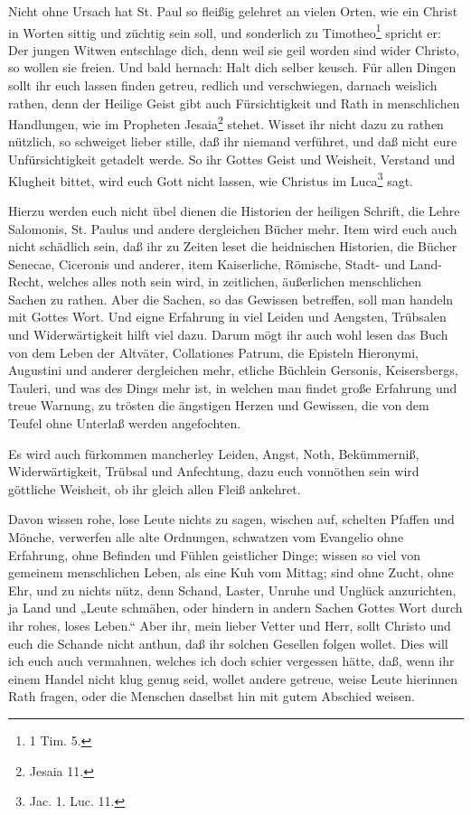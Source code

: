 Nicht ohne Ursach hat St. Paul so fleißig gelehret an vielen Orten, wie ein Christ in Worten sittig und züchtig sein soll, und sonderlich zu Timotheo\footnote{1 Tim. 5.} spricht er: Der jungen Witwen entschlage dich, denn weil sie geil worden sind wider Christo, so wollen sie freien. Und bald hernach: Halt dich selber keusch. Für allen Dingen sollt ihr euch lassen finden getreu, redlich und verschwiegen, darnach weislich rathen, denn der Heilige Geist gibt auch Fürsichtigkeit und Rath in menschlichen Handlungen, wie im Propheten Jesaia\footnote{Jesaia 11.} stehet. Wisset ihr nicht dazu zu rathen nützlich, so schweiget lieber stille, daß ihr niemand verführet, und daß nicht eure Unfürsichtigkeit getadelt werde. So ihr Gottes Geist und Weisheit, Verstand und Klugheit bittet, wird euch Gott nicht lassen, wie Christus im Luca\footnote{Jac. 1. Luc. 11.} sagt.

Hierzu werden euch nicht übel dienen die Historien der heiligen Schrift, die Lehre Salomonis, St. Paulus und andere dergleichen Bücher mehr. Item wird euch auch nicht schädlich sein, daß ihr zu Zeiten leset die heidnischen Historien, die Bücher Senecae, Ciceronis und anderer, item Kaiserliche, Römische, Stadt- und Land-Recht, welches alles noth sein wird, in zeitlichen, äußerlichen menschlichen Sachen zu rathen. Aber die Sachen, so das Gewissen betreffen, soll man handeln mit Gottes Wort. Und eigne Erfahrung in viel Leiden und Aengsten, Trübsalen und Widerwärtigkeit hilft viel dazu. Darum mögt ihr auch wohl lesen das Buch von dem Leben der Altväter, Collationes Patrum, die Episteln Hieronymi, Augustini und anderer dergleichen mehr, etliche Büchlein Gersonis, Keisersbergs, Tauleri, und was des Dings mehr ist, in welchen man findet große Erfahrung und treue Warnung, zu trösten die ängstigen
Herzen und Gewissen, die von dem Teufel ohne Unterlaß werden angefochten.

Es wird auch fürkommen mancherley Leiden, Angst, Noth, Bekümmerniß, Widerwärtigkeit, Trübsal und Anfechtung, dazu euch vonnöthen sein wird göttliche Weisheit, ob ihr gleich allen Fleiß ankehret.

Davon wissen rohe, lose Leute nichts zu sagen, wischen auf, schelten Pfaffen und Mönche, verwerfen alle alte Ordnungen, schwatzen vom Evangelio ohne Erfahrung, ohne Befinden und Fühlen geistlicher Dinge; wissen so viel von gemeinem menschlichen Leben, als eine Kuh vom Mittag; sind ohne Zucht, ohne Ehr, und zu nichts nütz, denn Schand, Laster, Unruhe und Unglück anzurichten, ja Land und „Leute schmähen, oder hindern in andern Sachen Gottes Wort durch ihr rohes, loses Leben.“ Aber ihr, mein lieber Vetter und Herr, sollt Christo und euch die Schande nicht anthun, daß ihr solchen Gesellen folgen wollet. Dies will ich euch auch vermahnen, welches ich doch schier vergessen hätte, daß, wenn ihr einem Handel nicht klug genug seid, wollet andere getreue, weise Leute hierinnen Rath fragen, oder die Menschen daselbst hin mit gutem Abschied weisen.

